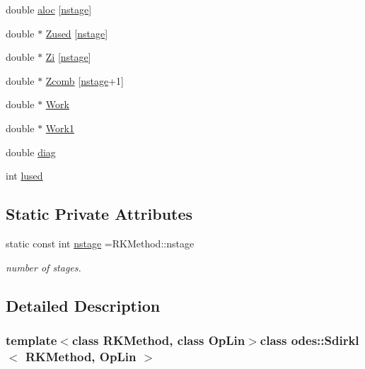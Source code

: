 \begin{DoxyCompactItemize}
\item 
double \hyperlink{classodes_1_1Sdirkl_a4e76e33316d69a2291706b9b658b1485}{aloc} \mbox{[}\hyperlink{classodes_1_1Sdirkl_add32e0557722940c648c1c7aa147effd}{nstage}\mbox{]}
\item 
double $\ast$ \hyperlink{classodes_1_1Sdirkl_a8992552ff8a2c441402317b9127a4859}{Zused} \mbox{[}\hyperlink{classodes_1_1Sdirkl_add32e0557722940c648c1c7aa147effd}{nstage}\mbox{]}
\item 
double $\ast$ \hyperlink{classodes_1_1Sdirkl_a4fddb392aa56e3b527d340e965e5cad2}{Zi} \mbox{[}\hyperlink{classodes_1_1Sdirkl_add32e0557722940c648c1c7aa147effd}{nstage}\mbox{]}
\item 
double $\ast$ \hyperlink{classodes_1_1Sdirkl_a9b1c9dcec951a5c76311cf692f711861}{Zcomb} \mbox{[}\hyperlink{classodes_1_1Sdirkl_add32e0557722940c648c1c7aa147effd}{nstage}+1\mbox{]}
\item 
double $\ast$ \hyperlink{classodes_1_1Sdirkl_abc65439561d1950d191452b9b467f29d}{Work}
\item 
double $\ast$ \hyperlink{classodes_1_1Sdirkl_ae3e0f5990ecdcb1b9d5e5c6cf2cd0da0}{Work1}
\item 
double \hyperlink{classodes_1_1Sdirkl_a0c19422d37c1bf1d40f41c14892befa8}{diag}
\item 
int \hyperlink{classodes_1_1Sdirkl_a9767ecd5dc2c32e369c09510afb9982d}{lused}
\end{DoxyCompactItemize}
\subsection*{Static Private Attributes}
\begin{DoxyCompactItemize}
\item 
static const int \hyperlink{classodes_1_1Sdirkl_add32e0557722940c648c1c7aa147effd}{nstage} =R\-K\-Method\-::nstage
\begin{DoxyCompactList}\small\item\em number of stages. \end{DoxyCompactList}\end{DoxyCompactItemize}


\subsection{Detailed Description}
\subsubsection*{template$<$class R\-K\-Method, class Op\-Lin$>$class odes\-::\-Sdirkl$<$ R\-K\-Method, Op\-Lin $>$}

